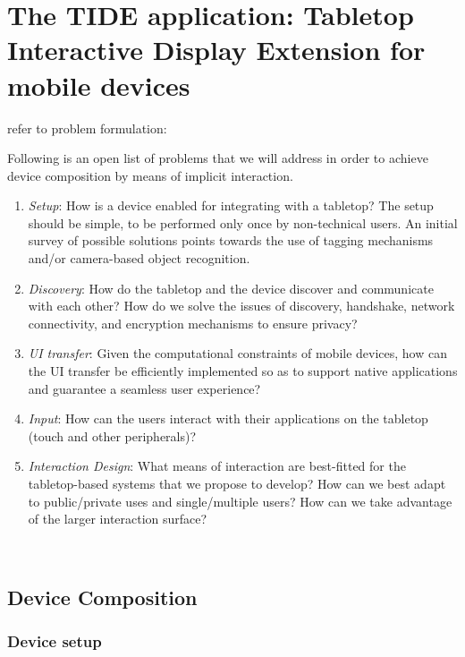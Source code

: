 

\chapter{The TIDE application: Tabletop Interactive Display Extension for mobile devices}
\label{system}

refer to problem formulation:

Following is an open list of problems that we will address in order to achieve device composition by means of implicit interaction.
\begin{enumerate}
\item{\emph{Setup}: How is a device enabled for integrating with a tabletop?
The setup should be simple, to be performed only once by non-technical users.
An initial survey of possible solutions points towards the use of tagging mechanisms and/or camera-based object recognition.}
\item{\emph{Discovery}: How do the tabletop and the device discover and communicate with each other?
How do we solve the issues of discovery, handshake, network connectivity, and encryption mechanisms to ensure privacy?}
\item{\emph{UI transfer}: Given the computational constraints of mobile devices, how can the UI transfer be efficiently implemented so as to support native applications and guarantee a seamless user experience?}
\item{\emph{Input}: How can the users interact with their applications on the tabletop (touch and other peripherals)?}
\item{\emph{Interaction Design}: What means of interaction are best-fitted for the tabletop-based systems that we propose to develop?
How can we best adapt to public/private uses and single/multiple users?
How can we take advantage of the larger interaction surface?}
\end{enumerate}

\hfill\\

\section{Device Composition}

\subsection{Device setup}


